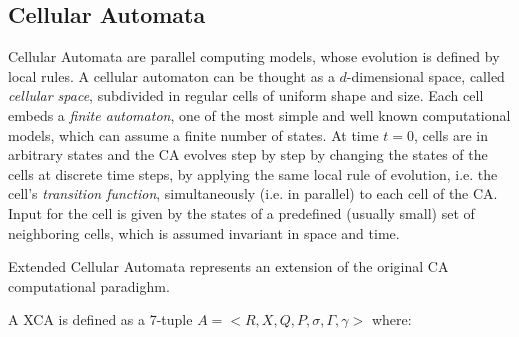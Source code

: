 \subsection{Cellular Automata}\label{sec:CA}
    Cellular Automata are parallel computing models, whose evolution
    is defined by local rules. A cellular automaton can be thought as
    a $d$-dimensional space, called \emph{cellular space}, subdivided
    in regular cells of uniform shape and size. Each cell embeds a
    \emph{finite automaton}, one of the most simple and well known
    computational models, which can assume a finite number of
    states. At time $t=0$, cells are in arbitrary states and the CA
    evolves step by step by changing the states of the cells at
    discrete time steps, by applying the same local rule of evolution,
    i.e. the cell's \emph{transition function}, simultaneously
    (i.e. in parallel) to each cell of the CA. Input for the cell is
    given by the states of a predefined (usually small) set of
    neighboring cells, which is assumed invariant in space and time.
 
 Extended Cellular Automata \cite{DiGregorio&Serra-1999} represents
    an extension of the original CA computational paradighm. 



   

    A XCA is defined as a 7-tuple $ A = <R,X,Q,P,\sigma,\Gamma,\gamma>$ where:

